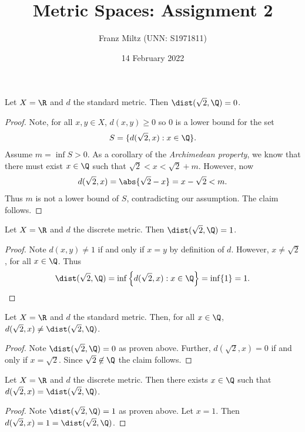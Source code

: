 \documentclass{article}
\begin{document}
\title{Metric Spaces: Assignment 2}
\author{Franz Miltz (UNN: S1971811)}
\date{14 February 2022}
\maketitle

\begin{claim*}[1a]
   Let $X=\R$ and $d$ the standard metric. Then $\dist(\sqrt 2, \Q)=0$.
   \begin{proof}
      Note, for all $x,y\in X$, $d(x,y) \geq 0$ so $0$ is a lower bound for the set 
      \begin{align*}
         S=\{d(\sqrt 2,x):x\in\Q\}.
      \end{align*}
      Assume $m=\inf S>0$. As a corollary of the \emph{Archimedean property}, we know that 
      there must exist $x\in\Q$ such that $\sqrt 2 < x < \sqrt{2}+m$. 
      However, now 
      \begin{align*}
         d(\sqrt 2, x) = \abs{\sqrt 2 - x} = x - \sqrt{2} < m.
      \end{align*}
      Thus $m$ is not a lower bound of $S$, contradicting our assumption. The claim follows.
   \end{proof}
\end{claim*}

\begin{claim*}[1b]
   Let $X=\R$ and $d$ the discrete metric. Then $\dist(\sqrt 2, \Q)=1$.
   \begin{proof}
      Note $d(x,y)\not=1$ if and only if $x=y$ by definition of $d$. However,
      $x\not=\sqrt{2}$, for all $x\in\Q$. Thus 
      \begin{align*}
         \dist(\sqrt 2,\Q) = \inf\left\lbrace d(\sqrt 2, x) : x\in\Q\right\rbrace = \inf\{1\} = 1.
      \end{align*}
   \end{proof}
\end{claim*}

\begin{claim*}[2]
   Let $X=\R$ and $d$ the standard metric. Then, for all $x\in\Q$, $d(\sqrt 2, x)\not=\dist(\sqrt 2, \Q)$.
   \begin{proof}
      Note $\dist(\sqrt 2, \Q)=0$ as proven above. Further, $d(\sqrt 2, x)=0$ if and only if 
      $x=\sqrt 2$. Since $\sqrt 2\not\in\Q$ the claim follows.
   \end{proof}
\end{claim*}

\begin{claim*}[2]
   Let $X=\R$ and $d$ the discrete metric. Then there exists $x\in\Q$ such that 
   $d(\sqrt 2, x) = \dist(\sqrt 2, \Q)$.
   \begin{proof}
      Note $\dist(\sqrt 2, \Q)=1$ as proven above. Let $x=1$. Then $d(\sqrt 2, x)=1=\dist(\sqrt 2, \Q)$. 
   \end{proof}
\end{claim*}
\end{document}
